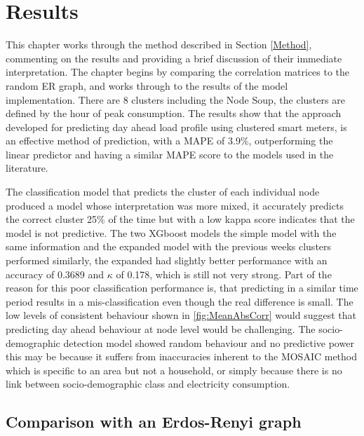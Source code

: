 \chapter{Results}
\label{Results}

This chapter works through the method described in Section \ref{Method}, commenting on the results and providing a brief discussion of their immediate interpretation. The chapter begins by comparing the correlation matrices to the random ER graph, and works through to the results of the model implementation. There are 8 clusters including the Node Soup, the clusters are defined by the hour of peak consumption.  The results show that the approach developed for predicting day ahead load profile using clustered smart meters, is an effective method of prediction, with a MAPE of 3.9\%, outperforming the linear predictor and having a similar MAPE score to the models used in the literature.

The classification model that predicts the cluster of each individual node produced a model whose interpretation was more mixed, it accurately predicts the correct cluster 25\% of the time but with a low kappa score indicates that the model is not predictive. The two XGboost models the simple model with the same information and the expanded model with the previous weeks clusters performed similarly, the expanded had slightly better performance with an accuracy of  0.3689 and $\kappa$ of 0.178, which is still not very strong. Part of the reason for this poor classification performance is, that predicting in a similar time period results in a mis-classification even though the real difference is small. The low levels of consistent behaviour shown in \ref{fig:MeanAbsCorr} would suggest that predicting day ahead behaviour at node level would be challenging.  The socio-demographic detection model showed random behaviour and no predictive power this may be because it suffers from inaccuracies inherent to the MOSAIC method which is specific to an area but not a household, or simply because there is no link between socio-demographic class and electricity consumption.


\section{Comparison with an Erdos-Renyi graph}

